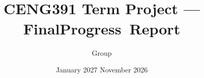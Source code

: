 \documentclass[11pt,a4paper]{article}
\title{\projecttitle\\[2pt]\large CENG391 Term Project --- \iffinal Final\else Progress\fi\ Report}
\author{Group \groupid\\ \members}
\date{\iffinal 4 January 2027\else 20 November 2026\fi}
\newif\iffinal
\newcommand{\todo}[1]{\textcolor{red}{[TODO: #1]}}
\begin{document}
\maketitle

\iffinal
\begin{abstract}
\todo{Single paragraph, at most about 250 words. Written last.}
\end{abstract}
\fi






\iffinal
  
  
\else
  
\fi





\end{document}
